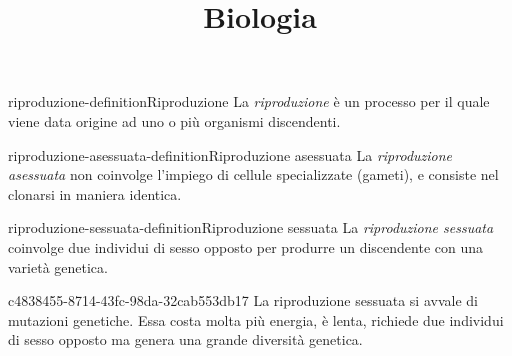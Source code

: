 \documentclass[preview]{standalone}
\begin{document}
\title{Biologia}
\genpage

\begin{snippetdefinition}{riproduzione-definition}{Riproduzione}
    La \textit{riproduzione} è un processo per il quale viene data origine ad uno o più organismi
    discendenti.
\end{snippetdefinition}

\begin{snippetdefinition}{riproduzione-asessuata-definition}{Riproduzione asessuata}
    La \textit{riproduzione asessuata} non coinvolge l'impiego di cellule specializzate (gameti),
    e consiste nel clonarsi in maniera identica.
\end{snippetdefinition}


\begin{snippetdefinition}{riproduzione-sessuata-definition}{Riproduzione sessuata}
    La \textit{riproduzione sessuata} coinvolge due individui di sesso opposto per produrre un discendente
    con una varietà genetica.
\end{snippetdefinition}

\begin{snippet}{c4838455-8714-43fc-98da-32cab553db17}
    La riproduzione sessuata si avvale di mutazioni genetiche.
    Essa costa molta più energia, è lenta, richiede due individui di sesso opposto ma
    genera una grande diversità genetica.
\end{snippet}
\end{document}

